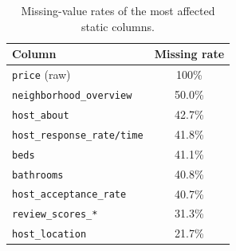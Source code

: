 \documentclass[journal]{IEEEtran}
\begin{document}
\begin{table}[!t]
\caption{Missing-value rates of the most affected static columns.}
\label{tab:missing}
\centering
\begin{tabular}{lc}
\toprule
Column & Missing rate \\
\midrule
\texttt{price} (raw) & 100\% \\
\texttt{neighborhood\_overview} & 50.0\% \\
\texttt{host\_about} & 42.7\% \\
\texttt{host\_response\_rate/time} & 41.8\% \\
\texttt{beds} & 41.1\% \\
\texttt{bathrooms} & 40.8\% \\
\texttt{host\_acceptance\_rate} & 40.7\% \\
\texttt{review\_scores\_*} & 31.3\% \\
\texttt{host\_location} & 21.7\% \\
\bottomrule
\end{tabular}
\end{table}
\end{document}
